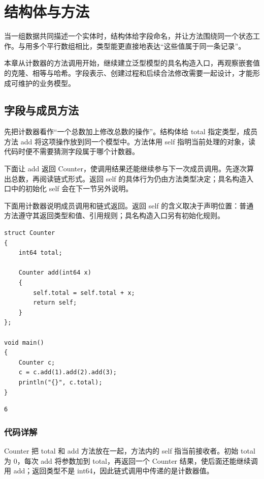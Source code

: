 \chapter{结构体与方法}
\label{ch:09}

当一组数据共同描述一个实体时，结构体给字段命名，并让方法围绕同一个状态工作。与用多个平行数组相比，类型能更直接地表达“这些值属于同一条记录”。

本章从计数器的方法调用开始，继续建立泛型模型的具名构造入口，再观察嵌套值的克隆、相等与哈希。字段表示、创建过程和后续合法修改需要一起设计，才能形成可维护的业务模型。

\section{字段与成员方法}

先把计数器看作“一个总数加上修改总数的操作”。结构体给 total 指定类型，成员方法 add 将这项操作放到同一个模型中。方法体用 self 指明当前处理的对象，读代码时便不需要猜测字段属于哪个计数器。

下面让 add 返回 Counter，使调用结果还能继续参与下一次成员调用。先逐次算出总数，再阅读链式形式。返回 self 的具体行为仍由方法类型决定；具名构造入口中的初始化 self 会在下一节另外说明。

下面用计数器说明成员调用和链式返回。返回 self 的含义取决于声明位置：普通方法遵守其返回类型和值、引用规则；具名构造入口另有初始化规则。

\par
\medskip
\begin{lstlisting}[style=chali]
struct Counter
{
    int64 total;

    Counter add(int64 x)
    {
        self.total = self.total + x;
        return self;
    }
};

void main()
{
    Counter c;
    c = c.add(1).add(2).add(3);
    println("{}", c.total);
}
\end{lstlisting}
\par
\medskip

\par
\medskip
\begin{lstlisting}[style=out]
6
\end{lstlisting}
\par
\medskip

\subsection*{代码详解}

Counter 把 total 和 add 方法放在一起，方法内的 self 指当前接收者。初始 total 为 0，每次 add 将参数加到 total，再返回一个 Counter 结果，使后面还能继续调用 add；返回类型不是 int64，因此链式调用中传递的是计数器值。

